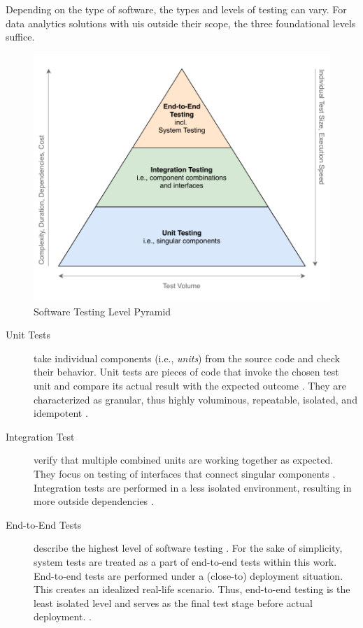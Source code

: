 Depending on the type of software, the types and levels of testing can vary. For data analytics solutions with \acp{ui} outside their scope, the three foundational levels suffice.

\begin{figure}[h!]
	\centering
	\includegraphics{main-matter/img/2-2-3-testing-pyramid.pdf}
	\caption{Software Testing Level Pyramid}
	\label{fig:2-testing-pyramid}
\end{figure}

\newpage



\begin{description}
	\item[Unit Tests] take individual components (i.e., \textit{units}) from the source code and check their behavior. Unit tests are pieces of code that invoke the chosen test unit and compare its actual result with the expected outcome \cite[sec. 1]{Osherove2013}. They are characterized as granular, thus highly voluminous, repeatable, isolated, and idempotent \cite[sec. 2]{Osherove2013}.
	\item[Integration Test] verify that multiple combined units are working together as expected. They focus on testing of interfaces that connect singular components \cite[66]{Mahfuz2016}. Integration tests are performed in a less isolated environment, resulting in more outside dependencies \cite[sec. 3]{Osherove2013}.
	\item[End-to-End Tests] describe the highest level of software testing \cite[67]{Mahfuz2016}. For the sake of simplicity, system tests are treated as a part of end-to-end tests within this work. End-to-end tests are performed under a (close-to) deployment situation. This creates an idealized real-life scenario. Thus, end-to-end testing is the least isolated level and serves as the final test stage before actual deployment. \cite[67]{Mahfuz2016}.
\end{description}



